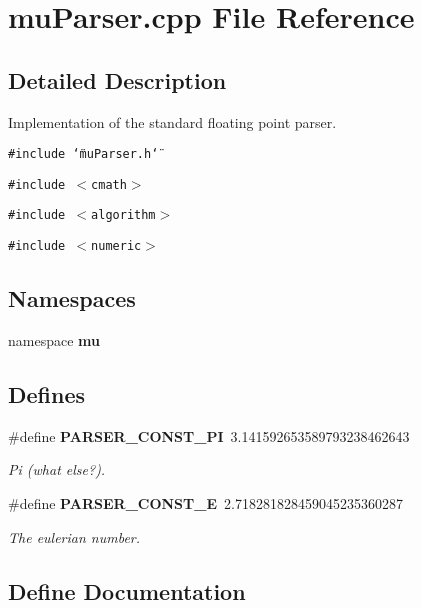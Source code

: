 \section{muParser.cpp File Reference}
\label{muParser_8cpp}


\subsection{Detailed Description}
Implementation of the standard floating point parser. 



{\tt \#include \char`\"{}muParser.h\char`\"{}}\par
{\tt \#include $<$cmath$>$}\par
{\tt \#include $<$algorithm$>$}\par
{\tt \#include $<$numeric$>$}\par
\subsection*{Namespaces}
\begin{CompactItemize}
\item 
namespace {\bf mu}
\end{CompactItemize}
\subsection*{Defines}
\begin{CompactItemize}
\item 
\#define {\bf PARSER\_\-CONST\_\-PI}~3.141592653589793238462643
\begin{CompactList}\small\item\em Pi (what else?). \item\end{CompactList}\item 
\#define {\bf PARSER\_\-CONST\_\-E}~2.718281828459045235360287
\begin{CompactList}\small\item\em The eulerian number. \item\end{CompactList}\end{CompactItemize}


\subsection{Define Documentation}
